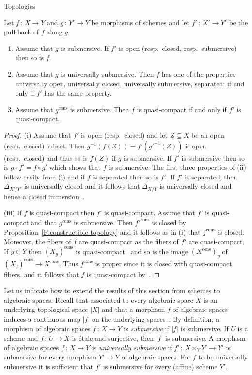 \documentclass[a4paper,twoside,11pt]{amsart}[2009/07/02] %
\newcommand{\pref}[1]{\eqref{#1}}
\newcommand{\map}[3]{#1\,:\, #2\rightarrow #3}
\newcommand{\etale}{\'{e}tale}
\newcommand{\cons}{\mathrm{cons}} %
\begin{document}
\begin{section}{Topologies}
\begin{proposition}\label{P:descent-of-top-props}
Let $\map{f}{X}{Y}$ and $\map{g}{Y'}{Y}$ be morphisms of schemes and
let $\map{f'}{X'}{Y'}$ be the pull-back of $f$ along $g$.
%
\begin{enumerate}
\item Assume that $g$ is submersive. If $f'$ is open
(resp.\ closed, resp.\ submersive) then so is $f$.
\item Assume that $g$ is universally submersive. Then $f$ has one of the
properties: universally open, universally closed, universally submersive,
separated; if and only if $f'$ has the same property.
\item Assume that $g^{\cons}$ is submersive. Then $f$ is quasi-compact if and
only if $f'$ is quasi-compact.
\end{enumerate}
\end{proposition}
\begin{proof}
(i) Assume that $f'$ is open (resp.\ closed) and let $Z\subseteq X$ be an open
(resp.\ closed) subset. Then $g^{-1}(f(Z))=f'(g'^{-1}(Z))$ is open
(resp.\ closed) and thus so is $f(Z)$ if $g$ is submersive. If $f'$ is
submersive then so is $g\circ f'=f\circ g'$ which shows that $f$ is
submersive.
%
The first three properties of (ii) follow easily from (i) and if $f$ is
separated then so is $f'$. If $f'$ is separated, then $\Delta_{X'/Y'}$ is
universally closed and it follows that $\Delta_{X/Y}$ is universally closed and
hence a closed immersion~\cite[Cor.~18.12.6]{egaIV}.

(iii) If $f$ is quasi-compact then $f'$ is quasi-compact. Assume that $f'$ is
quasi-compact and that $g^{\cons}$ is submersive. Then $f'^{\cons}$ is closed
by Proposition~\pref{P:constructible-topology} and it follows as in (i) that
$f^{\cons}$ is closed. Moreover, the fibers of $f$ are quasi-compact as the
fibers of $f'$ are quasi-compact. If $y\in Y$ then $(X_y)^{\cons}$ is
quasi-compact~\cite[Prop.~7.2.13 (i)]{egaI_NE} and so is the image
$(X^{\cons})_y$ of $(X_y)^{\cons}\to X^{\cons}$. Thus $f^{\cons}$ is proper
since it is closed with quasi-compact fibers, and it follows that $f$ is
quasi-compact by~\cite[Prop.~7.2.13 (v)]{egaI_NE}.
\end{proof}

\begin{remark}
Let us
%
indicate how to extend the results of this section from schemes to algebraic
spaces. Recall that associated to every algebraic space $X$ is an underlying
topological space $|X|$
and that a morphism $f$ of algebraic spaces induces a continuous map $|f|$ on
the underlying spaces~\cite[II.6]{knutson_alg_spaces}. By definition, a
morphism of algebraic spaces $\map{f}{X}{Y}$ is \emph{submersive} if $|f|$ is
submersive. If $U$ is a scheme and $\map{f}{U}{X}$ is \etale{} and surjective,
then $|f|$ is submersive. A morphism of algebraic spaces $\map{f}{X}{Y}$ is
\emph{universally submersive} if $\map{f'}{X\times_Y Y'}{Y'}$ is submersive for
every morphism $Y'\to Y$ of algebraic spaces. For $f$ to be universally
submersive it is sufficient that $f'$ is submersive for every (affine) scheme
$Y'$.


\end{remark}
\end{section}
\end{document}
